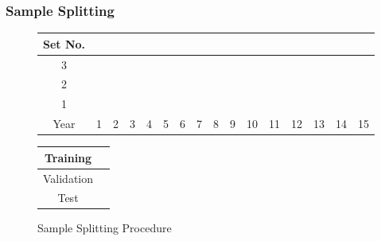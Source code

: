 \documentclass[]{beamer}
\begin{document}

\begin{frame}
\frametitle{Sample Splitting}
\begin{figure}
	\begin{center}
		\begin{tabular}{|c|p{0.25cm}p{0.25cm}p{0.25cm}p{0.25cm}p{0.25cm}p{0.25cm}p{0.25cm}p{0.25cm}p{0.25cm}p{0.25cm}p{0.25cm}p{0.25cm}|p{0.25cm}p{0.25cm}p{0.25cm}|}
			\hline
			Set No. &&&&&&&&&&&&&&& \\
			\hline
			3 & \cellcolor{cyan} & \cellcolor{cyan} & \cellcolor{cyan} & \cellcolor{cyan} & \cellcolor{cyan} & \cellcolor{cyan} & \cellcolor{cyan} & \cellcolor{cyan} & \cellcolor{cyan} & \cellcolor{cyan} & \cellcolor{cyan} &
			\cellcolor{pink} & 
			\cellcolor{olive} & \cellcolor{olive} &	\cellcolor{olive} \\
			2 & \cellcolor{cyan} & \cellcolor{cyan} & \cellcolor{cyan} & \cellcolor{cyan} & \cellcolor{cyan} & \cellcolor{cyan} & \cellcolor{cyan} & \cellcolor{cyan} & \cellcolor{cyan} & \cellcolor{cyan} &
			\cellcolor{pink} & 
			\cellcolor{olive} & \cellcolor{olive} &	\cellcolor{olive} & \cellcolor{olive} \\
			1 & \cellcolor{cyan} & \cellcolor{cyan} & \cellcolor{cyan} & \cellcolor{cyan} & \cellcolor{cyan} & \cellcolor{cyan} & \cellcolor{cyan} & \cellcolor{cyan} & \cellcolor{cyan} &
			\cellcolor{pink} & 
			\cellcolor{olive} & \cellcolor{olive} &	\cellcolor{olive} & \cellcolor{olive} & \cellcolor{olive} \\
			\hline
			Year & 1 & 2 & 3 & 4 & 5 & 6 & 7 & 8 & 9 & 10 & 11 & 12 & 13 & 14 & 15\\
			\hline
		\end{tabular}
		\medskip
		\begin{tabular}{|c|p{0.25cm}|}
			\hline
			Training & \cellcolor{cyan} \\
			\hline
			Validation & \cellcolor{pink} \\
			\hline
			Test & \cellcolor{olive} \\
			\hline
		\end{tabular}
	\end{center}
	\caption{Sample Splitting Procedure}
\end{figure}
\end{frame}
\end{document}
